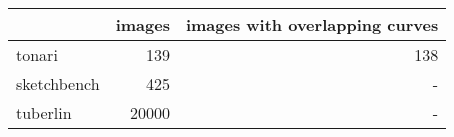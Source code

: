 \begin{tabular}{lrr}
\toprule
 & images & images with overlapping curves \\
\midrule
tonari & 139 & 138 \\
sketchbench & 425 & - \\
tuberlin & 20000 & - \\
\bottomrule
\end{tabular}
